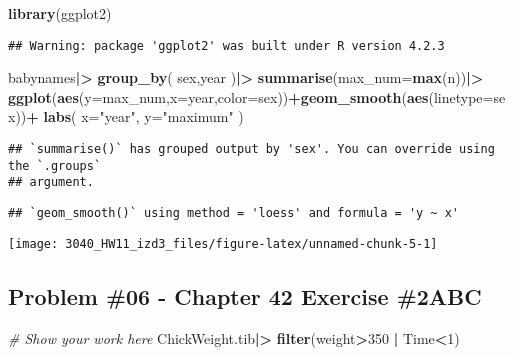 \documentclass[
]{article}
\newenvironment{Shaded}{\begin{snugshade}}{\end{snugshade}}
\newcommand{\AttributeTok}[1]{\textcolor[rgb]{0.13,0.29,0.53}{#1}}
\newcommand{\CommentTok}[1]{\textcolor[rgb]{0.56,0.35,0.01}{\textit{#1}}}
\newcommand{\DecValTok}[1]{\textcolor[rgb]{0.00,0.00,0.81}{#1}}
\newcommand{\FunctionTok}[1]{\textcolor[rgb]{0.13,0.29,0.53}{\textbf{#1}}}
\newcommand{\NormalTok}[1]{#1}
\newcommand{\SpecialCharTok}[1]{\textcolor[rgb]{0.81,0.36,0.00}{\textbf{#1}}}
\newcommand{\StringTok}[1]{\textcolor[rgb]{0.31,0.60,0.02}{#1}}
\begin{document}
\begin{Shaded}
\begin{Highlighting}[]
\FunctionTok{library}\NormalTok{(ggplot2)}
\end{Highlighting}
\end{Shaded}

\begin{verbatim}
## Warning: package 'ggplot2' was built under R version 4.2.3
\end{verbatim}

\begin{Shaded}
\begin{Highlighting}[]
\NormalTok{babynames}\SpecialCharTok{|\textgreater{}}
  \FunctionTok{group\_by}\NormalTok{(}
\NormalTok{    sex,year}
\NormalTok{  )}\SpecialCharTok{|\textgreater{}}
  \FunctionTok{summarise}\NormalTok{(}\AttributeTok{max\_num=}\FunctionTok{max}\NormalTok{(n))}\SpecialCharTok{|\textgreater{}}
  \FunctionTok{ggplot}\NormalTok{(}\FunctionTok{aes}\NormalTok{(}\AttributeTok{y=}\NormalTok{max\_num,}\AttributeTok{x=}\NormalTok{year,}\AttributeTok{color=}\NormalTok{sex))}\SpecialCharTok{+}\FunctionTok{geom\_smooth}\NormalTok{(}\FunctionTok{aes}\NormalTok{(}\AttributeTok{linetype=}\NormalTok{sex))}\SpecialCharTok{+}
  \FunctionTok{labs}\NormalTok{(}
    \AttributeTok{x=}\StringTok{"year"}\NormalTok{,}
    \AttributeTok{y=}\StringTok{"maximum"}
\NormalTok{  )}
\end{Highlighting}
\end{Shaded}

\begin{verbatim}
## `summarise()` has grouped output by 'sex'. You can override using the `.groups`
## argument.
\end{verbatim}

\begin{verbatim}
## `geom_smooth()` using method = 'loess' and formula = 'y ~ x'
\end{verbatim}

\texttt{[image: 3040\_HW11\_izd3\_files/figure-latex/unnamed-chunk-5-1]}

\newpage

\hypertarget{problem-06---chapter-42-exercise-2abc}{%
\subsection{Problem \#06 - Chapter 42 Exercise
\#2ABC}\label{problem-06---chapter-42-exercise-2abc}}

\begin{Shaded}
\begin{Highlighting}[]
\CommentTok{\# Show your work here}
\NormalTok{ChickWeight.tib}\SpecialCharTok{|\textgreater{}}
  \FunctionTok{filter}\NormalTok{(weight}\SpecialCharTok{\textgreater{}}\DecValTok{350} \SpecialCharTok{|}\NormalTok{ Time}\SpecialCharTok{\textless{}}\DecValTok{1}\NormalTok{)}
\end{Highlighting}
\end{Shaded}
\end{document}
